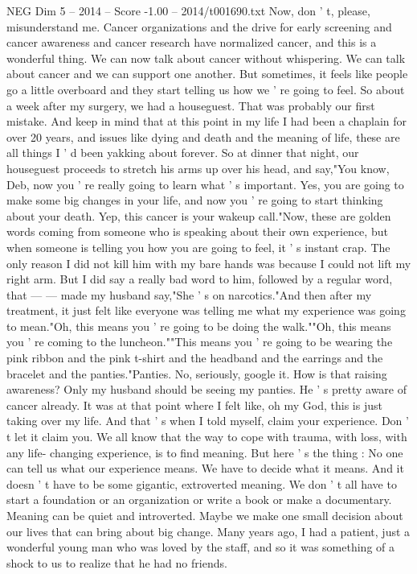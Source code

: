 \begin{textsample}{NEG Dim 5 – 2014 – Score -1.00 – 2014/t001690.txt}
Now, don ' t, please, misunderstand me.
Cancer organizations and the drive for early screening and cancer awareness and cancer research have normalized cancer, and this is a wonderful thing.
We can now talk about cancer without whispering.
We can talk about cancer and we can support one another.
But sometimes, it feels like people go a little overboard and they start telling us how we ' re going to feel.
So about a week after my surgery, we had a houseguest.
That was probably our first mistake.
And keep in mind that at this point in my life I had been a chaplain for over 20 years, and issues like dying and death and the meaning of life, these are all things I ' d been yakking about forever.
So at dinner that night, our houseguest proceeds to stretch his arms up over his head, and say,"You know, Deb, now you ' re really going to learn what ' s important.
Yes, you are going to make some big changes in your life, and now you ' re going to start thinking about your death.
Yep, this cancer is your wakeup call."Now, these are golden words coming from someone who is speaking about their own experience, but when someone is telling you how you are going to feel, it ' s instant crap.
The only reason I did not kill him with my bare hands was because I could not lift my right arm.
But I did say a really bad word to him, followed by a regular word, that — — made my husband say,"She ' s on narcotics."And then after my treatment, it just felt like everyone was telling me what my experience was going to mean."Oh, this means you ' re going to be doing the walk.""Oh, this means you ' re coming to the luncheon.""This means you ' re going to be wearing the pink ribbon and the pink t-shirt and the headband and the earrings and the bracelet and the panties."Panties.
No, seriously, google it.
How is that raising awareness?
Only my husband should be seeing my panties.
He ' s pretty aware of cancer already.
It was at that point where I felt like, oh my God, this is just taking over my life.
And that ' s when I told myself, claim your experience.
Don ' t let it claim you.
We all know that the way to cope with trauma, with loss, with any life- changing experience, is to find meaning.
But here ' s the thing : No one can tell us what our experience means.
We have to decide what it means.
And it doesn ' t have to be some gigantic, extroverted meaning.
We don ' t all have to start a foundation or an organization or write a book or make a documentary.
Meaning can be quiet and introverted.
Maybe we make one small decision about our lives that can bring about big change.
Many years ago, I had a patient, just a wonderful young man who was loved by the staff, and so it was something of a shock to us to realize that he had no friends.

\end{textsample}
